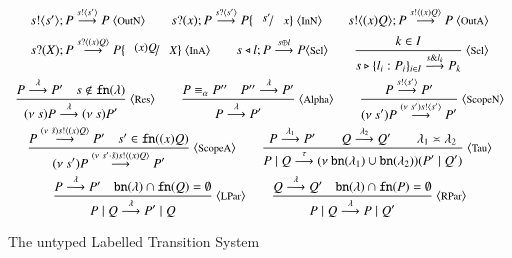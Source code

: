 \begin{figure}
	\[
	\begin{array}{c}
		\bout{s}{s'} P \by{\bactout{s}{s'}} P\ \ltsrule{OutN}
		\qquad
		\binp{s}{x} P \by{\bactinp{s}{s'}} P\subst{s'}{x}\ \ltsrule{InN}
		\qquad
		\bout{s}{\abs{x}{Q}} P \by{\bactout{s}{\abs{x}{Q}}} P\ \ltsrule{OutA}
		\\[2mm]

		\binp{s}{X} P \by{\bactinp{s}{\abs{x}Q}} P\subst{\abs{x}Q}{X}\ \ltsrule{InA}
		\qquad
		\bsel{s}{l}{P} \by{\bactsel{s}{l}} P \ltsrule{Sel}
		\qquad
		\tree{
			k \in I
		}
		{
			\bbra{s}{l_i:P_i}_{i \in I} \by{\bactbra{s}{l_k}} P_k
		}\ \ltsrule{Sel}
		\\[5mm]

		\tree{
			P \by{\lambda} P' \quad s \notin \fn{\lambda}
		}{
			\news{s} P \by{\lambda} \news{s} P' 
		}\ \ltsrule{Res}
		\qquad
		\tree{
			P \scong_\alpha P'' \quad P'' \by{\lambda} P'
		}{
			P \by{\lambda} P'
		}\ \ltsrule{Alpha}
		\qquad
		\tree{
			P \by{\bactout{s}{s'}} P'
		}{
			\news{s'} P \by{\news{s'} \bactout{s}{s'}} P'
		}\ \ltsrule{ScopeN}
		\\[5mm]

		\tree{
			P \by{\news{\tilde{s}} \bactout{s}{\abs{x} Q}} P' \quad s' \in \fn{\abs{x} Q}
		}{
			\news{s'} P \by{\news{s'\cat\tilde{s}} \bactout{s}{\abs{x} Q}} P'
		}\ \ltsrule{ScopeA}
		\qquad
		\tree{
			P \by{\lambda_1} P' \qquad Q \by{\lambda_2} Q' \qquad \lambda_1 \asymp \lambda_2
		}{
			P \Par Q \by{\tau} \newsp{\bn{\lambda_1} \cup \bn{\lambda_2}}{P' \Par Q'}
		}\ \ltsrule{Tau}
		\\[5mm]

		\tree{

			P \by{\lambda} P' \quad \bn{\lambda} \cap \fn{Q} = \es
		}{
			P \Par Q \by{\lambda} P' \Par Q
		}\ \ltsrule{LPar}
		\qquad
		\tree{
			Q \by{\lambda} Q' \quad \bn{\lambda} \cap \fn{P} = \es
		}{
			P \Par Q \by{\lambda} P \Par Q'
		}\ \ltsrule{RPar}
	\end{array}
	\]
	\caption{The untyped Labelled Transition System \label{fig:untyped_LTS}}
\end{figure}
